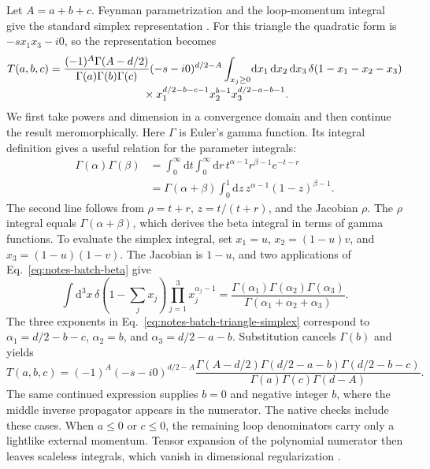 Let \(A=a+b+c\). Feynman parametrization and the loop-momentum integral give the standard simplex representation \cite{Weinzierl2022}. For this triangle the quadratic form is \(-s x_1x_3-i0\), so the representation becomes
\begin{align}
 T(a,b,c)
 &=
 \frac{(-1)^A\Gamma(A-d/2)}{\Gamma(a)\Gamma(b)\Gamma(c)}
 (-s-i0)^{d/2-A}
 \int_{x_j\ge0}\!\mathrm dx_1\,\mathrm dx_2\,\mathrm dx_3\,
 \delta(1-x_1-x_2-x_3)
 \nonumber\\[-2pt]
 &\hspace{30mm}\times
 x_1^{d/2-b-c-1}x_2^{b-1}x_3^{d/2-a-b-1}.
 \label{eq:notes-batch-triangle-simplex}
\end{align}
We first take powers and dimension in a convergence domain and then continue the result meromorphically. Here \(\Gamma\) is Euler's gamma function. Its integral definition gives a useful relation for the parameter integrals:
\begin{align}
 \Gamma(\alpha)\Gamma(\beta)
 &=\int_0^\infty\!\mathrm dt\int_0^\infty\!\mathrm dr\,
 t^{\alpha-1}r^{\beta-1}e^{-t-r}
 \nonumber\\
 &=\Gamma(\alpha+\beta)
 \int_0^1\!\mathrm dz\,z^{\alpha-1}(1-z)^{\beta-1}.
 \label{eq:notes-batch-beta}
\end{align}
The second line follows from \(\rho=t+r\), \(z=t/(t+r)\), and the Jacobian \(\rho\). The \(\rho\) integral equals \(\Gamma(\alpha+\beta)\), which derives the beta integral in terms of gamma functions. To evaluate the simplex integral, set \(x_1=u\), \(x_2=(1-u)v\), and \(x_3=(1-u)(1-v)\). The Jacobian is \(1-u\), and two applications of Eq.~\eqref{eq:notes-batch-beta} give
\begin{equation}
 \int\!\mathrm d^3x\,\delta(1-\textstyle\sum_jx_j)
 \prod_{j=1}^3x_j^{\alpha_j-1}
 =
 \frac{\Gamma(\alpha_1)\Gamma(\alpha_2)\Gamma(\alpha_3)}
 {\Gamma(\alpha_1+\alpha_2+\alpha_3)}.
 \label{eq:notes-batch-dirichlet}
\end{equation}
The three exponents in Eq.~\eqref{eq:notes-batch-triangle-simplex} correspond to
\(\alpha_1=d/2-b-c\), \(\alpha_2=b\), and \(\alpha_3=d/2-a-b\). Substitution cancels \(\Gamma(b)\) and yields
\begin{equation}
 T(a,b,c)=
 (-1)^A(-s-i0)^{d/2-A}
 \frac{\Gamma(A-d/2)\Gamma(d/2-a-b)\Gamma(d/2-b-c)}
 {\Gamma(a)\Gamma(c)\Gamma(d-A)}.
 \label{eq:notes-batch-triangle-gamma}
\end{equation}
The same continued expression supplies \(b=0\) and negative integer \(b\), where the middle inverse propagator appears in the numerator. The native checks include these cases. When \(a\le0\) or \(c\le0\), the remaining loop denominators carry only a lightlike external momentum. Tensor expansion of the polynomial numerator then leaves scaleless integrals, which vanish in dimensional regularization \cite{Weinzierl2022}.

